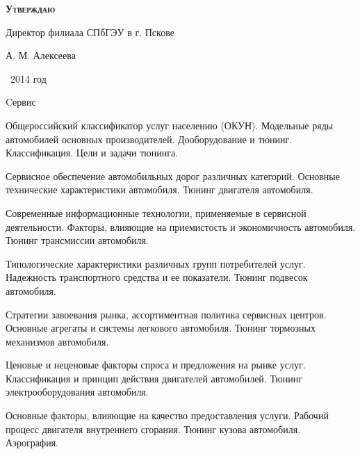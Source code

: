 \documentclass[
	11pt,
	a4paper,
	]
	{article}
\begin{document}
\newlength{\pblength}\settowidth{\pblength}{Директор филиала СПбГЭУ в г. Пскове}

\hfill\parbox{\pblength}{
	\textbf{\textsc{Утверждаю}}\medskip

	Директор филиала СПбГЭУ в г. Пскове\medskip

	\makebox[3cm]{\hrulefill} А. М. Алексеева\medskip

	\makebox[1.5cm]{<<\hrulefill>>} \makebox[3cm]{\hrulefill}\ 2014 год
}


 {Cервис}

	

\noindent{} 
	{
		Общероссийский классификатор услуг населению (ОКУН).
	}{
		Модельные ряды автомобилей основных производителей.
	}{
		Дооборудование и тюнинг. Классификация. Цели и задачи тюнинга.
	}

\bigskip

\noindent{} 
	{
		Сервисное обеспечение автомобильных дорог различных категорий.
	}{
		Основные технические характеристики автомобиля.
	}{
		Тюнинг двигателя автомобиля.
	}

\bigskip

\noindent{} 
	{
		Современные информационные технологии, применяемые в сервисной деятельности.
	}{
		Факторы, влияющие на приемистость и экономичность автомобиля.
	}{
		Тюнинг трансмиссии автомобиля.
	}

\bigskip

\noindent{} 
	{
		Типологические характеристики различных групп потребителей услуг.
	}{
		Надежность транспортного средства и ее показатели.
	}{
		Тюнинг подвесок автомобиля.
	}

\bigskip

\noindent{} 
	{
		Стратегии завоевания рынка, ассортиментная политика сервисных центров.
	}{
		Основные агрегаты и системы легкового автомобиля.
	}{
		Тюнинг тормозных механизмов автомобиля.
	}

\bigskip

\noindent{} 
	{
		Ценовые и неценовые факторы спроса и предложения на рынке услуг.
	}{
		Классификация и принцип действия двигателей автомобилей.
	}{
		Тюнинг электрооборудования автомобиля.
	}

\bigskip

\noindent{} 
	{
		Основные факторы, влияющие на качество предоставления услуги.
	}{
		Рабочий процесс двигателя внутреннего сгорания.
	}{
		Тюнинг кузова автомобиля. Аэрография.
	}
\end{document}
